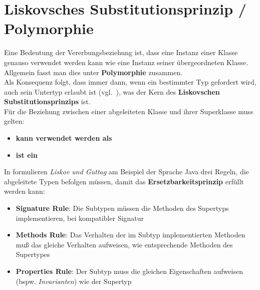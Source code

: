 \section{Liskovsches Substitutionsprinzip / Polymorphie}

\begin{tcolorbox}[title=Liskovsches Substitutionsprinzip / Polymorphie]
Eine Bedeutung der Vererbungsbeziehung ist, dass eine Instanz einer Klasse genauso verwendet werden kann wie eine Instanz seiner übergeordneten Klasse.\\
Allgemein fasst man dies unter \textbf{Polymorphie} zusammen.\\
Als Konsequenz folgt, dass immer dann, wenn ein bestimmter Typ gefordert wird, auch sein Untertyp erlaubt ist (vgl.~\cite[466]{Ull23}), was der Kern des \textbf{Liskovschen Substitutionsprinzips} ist.\\

\noindent
Für die Beziehung zwischen einer abgeleiteten Klasse und ihrer Superklasse muss gelten:

\begin{itemize}
    \item \textbf{kann verwendet werden als}
    \item \textbf{ist ein}
\end{itemize}

In \cite[174 ff.]{LG00} formulieren \textit{Liskov und Guttag} am Beispiel der Sprache Java drei Regeln, die abgeleitete Typen befolgen müssen, damit das \textbf{Ersetzbarkeitsprinzip} erfüllt werden kann:
\begin{itemize}
    \item \textbf{Signature Rule}: Die Subtypen müssen die Methoden des Supertyps implementieren, bei kompatibler Signatur
    \item \textbf{Methods Rule}: Das Verhalten der im Subtyp implementierten Methoden muß das gleiche Verhalten aufweisen, wie entsprechende Methoden des Supertypes
    \item \textbf{Properties Rule}: Der Subtyp muss die gleichen Eigenschaften aufweisen (bspw. \textit{Invarianten}) wie der Supertyp
\end{itemize}
\end{tcolorbox}
